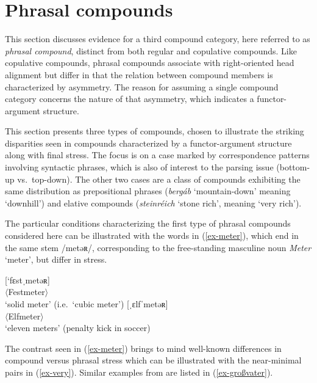 \documentclass[output=paper
 ,nobabel
 ,draftmode
 ,colorlinks, citecolor=brown
]{langscibook}
\begin{document}
\section{Phrasal compounds}
\label{sec-phracom}

This section discusses evidence for a third compound category, here referred to as \emph{phrasal compound}, distinct from both regular and copulative compounds. Like copulative compounds, phrasal compounds associate with right-oriented head alignment but differ in that the relation between compound members is characterized by asymmetry. The reason for assuming a single compound category concerns the nature of that asymmetry, which indicates a functor-argument structure. 

This section presents three types of compounds, chosen to illustrate the striking disparities seen in  compounds characterized by a functor-argument structure along with final stress. The focus is on a case marked by correspondence patterns involving syntactic phrases, which is also of interest to the parsing issue (bottom-up vs.\ top-down). The other two cases are a class of compounds exhibiting the same distribution as prepositional phrases (\eg \emph{bergáb} `mountain-down' meaning `downhill') and elative compounds (\eg \emph{steinréich} `stone rich', meaning `very rich').

The particular conditions characterizing the first type of phrasal compounds considered here can be illustrated with the words in (\ref{ex-meter}), which end in the same stem /metəʀ/, corresponding to the free-standing masculine noun \emph{Meter} `meter', but differ in stress. 

\eal\label{ex-meter}
\ex\label{ex-qm} 
[`fɛstˌmetəʀ]\\
$\langle$Festmeter$\rangle$\\
`solid meter' (i.e.\ `cubic meter')
%
%
\ex\label{ex-penalty}
[ˌɛlfˈmetəʀ]\\
$\langle$Elfmeter$\rangle$\\
`eleven meters' (penalty kick in soccer)
\zl

\noindent
The contrast seen in (\ref{ex-meter}) brings to mind well-known differences in compound versus phrasal stress which can be illustrated with the near-minimal pairs in (\ref{ex-very}). Similar examples from  are listed in (\ref{ex-großvater}).
\end{document}
